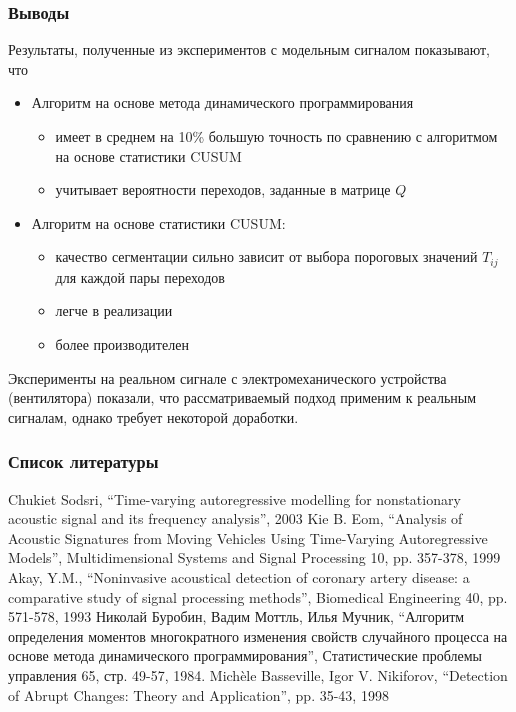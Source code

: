 \documentclass[9pt]{beamer}
\begin{document}
\begin{frame}\frametitle{Выводы}
Результаты, полученные из экспериментов с модельным сигналом показывают, что
\begin{itemize}
\item Алгоритм на основе метода динамического программирования
\begin{itemize}
\item имеет в среднем на 10\% большую точность по сравнению с алгоритмом
на основе статистики CUSUM
\item учитывает вероятности переходов, заданные в матрице $Q$
\end{itemize}
\item Алгоритм на основе статистики CUSUM:
\begin{itemize}
\item качество сегментации сильно зависит от выбора пороговых
значений $T_{ij}$ для каждой пары переходов
\item легче в реализации
\item более производителен
\end{itemize}
\end{itemize}

Эксперименты на реальном сигнале с электромеханического
устройства (вентилятора) показали, что рассматриваемый
подход применим к реальным сигналам, однако требует некоторой доработки.
\end{frame}

\begin{frame}\frametitle{Список литературы}
\begin{thebibliography}{99}
 Chukiet Sodsri, ``Time-varying autoregressive modelling for nonstationary acoustic signal and its frequency analysis'', 2003
 Kie B. Eom, ``Analysis of Acoustic Signatures from Moving Vehicles Using Time-Varying Autoregressive Models'', Multidimensional Systems and Signal Processing 10, pp. 357-378, 1999
 Akay, Y.M., ``Noninvasive acoustical detection of coronary artery disease: a comparative study of signal processing methods'', Biomedical Engineering 40, pp. 571-578, 1993
 Николай Буробин, Вадим Моттль, Илья Мучник, ``Алгоритм определения моментов многократного изменения свойств случайного процесса на основе метода динамического программирования'', Статистические проблемы управления 65, стр. 49-57, 1984.
 Mich\`{e}le Basseville, Igor V. Nikiforov, ``Detection of Abrupt Changes: Theory and Application'', pp. 35-43, 1998
\end{thebibliography}
\end{frame}
\end{document}
